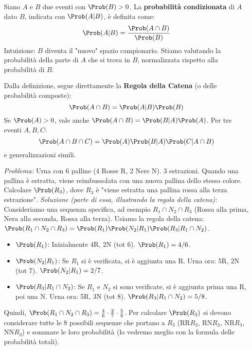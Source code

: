\begin{definition}
Siano $A$ e $B$ due eventi con $\Prob(B) > 0$. La \textbf{probabilità condizionata} di $A$ dato $B$, indicata con $\Prob(A|B)$, è definita come:
\[ \Prob(A|B) = \frac{\Prob(A \cap B)}{\Prob(B)} \]
Intuizione: $B$ diventa il "nuovo" spazio campionario. Stiamo valutando la probabilità della parte di $A$ che si trova in $B$, normalizzata rispetto alla probabilità di $B$.
\end{definition}

Dalla definizione, segue direttamente la \textbf{Regola della Catena} (o delle probabilità composte):
\[ \Prob(A \cap B) = \Prob(A|B) \Prob(B) \]
Se $\Prob(A)>0$, vale anche $\Prob(A \cap B) = \Prob(B|A) \Prob(A)$.
Per tre eventi $A, B, C$:
\[ \Prob(A \cap B \cap C) = \Prob(A) \Prob(B|A) \Prob(C|A \cap B) \]
e generalizzazioni simili.

\begin{example}
\textit{Problema:} Urna con 6 palline (4 Rosse R, 2 Nere N). 3 estrazioni. Quando una pallina è estratta, viene reimbussolata con una nuova pallina dello stesso colore. Calcolare $\Prob(R_3)$, dove $R_3$ è "viene estratta una pallina rossa alla terza estrazione".
\textit{Soluzione (parte di essa, illustrando la regola della catena):}
Consideriamo una sequenza specifica, ad esempio $R_1 \cap N_2 \cap R_3$ (Rossa alla prima, Nera alla seconda, Rossa alla terza).
Usiamo la regola della catena: $\Prob(R_1 \cap N_2 \cap R_3) = \Prob(R_1) \Prob(N_2|R_1) \Prob(R_3|R_1 \cap N_2)$.
\begin{itemize}
    \item $\Prob(R_1)$: Inizialmente 4R, 2N (tot 6). $\Prob(R_1) = 4/6$.
    \item $\Prob(N_2|R_1)$: Se $R_1$ si è verificata, si è aggiunta una R. Urna ora: 5R, 2N (tot 7). $\Prob(N_2|R_1) = 2/7$.
    \item $\Prob(R_3|R_1 \cap N_2)$: Se $R_1$ e $N_2$ si sono verificate, si è aggiunta prima una R, poi una N. Urna ora: 5R, 3N (tot 8). $\Prob(R_3|R_1 \cap N_2) = 5/8$.
\end{itemize}
Quindi, $\Prob(R_1 \cap N_2 \cap R_3) = \frac{4}{6} \cdot \frac{2}{7} \cdot \frac{5}{8}$.
Per calcolare $\Prob(R_3)$ si devono considerare tutte le 8 possibili sequenze che portano a $R_3$ (RR$R_3$, RN$R_3$, NR$R_3$, NN$R_3$) e sommare le loro probabilità (lo vedremo meglio con la formula delle probabilità totali).
\end{example}

